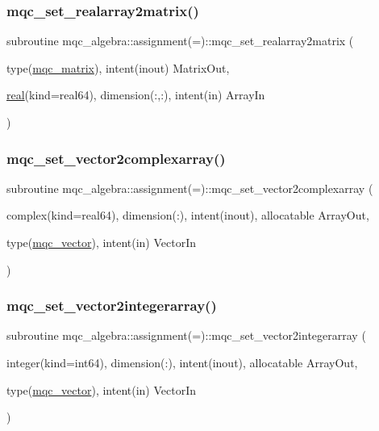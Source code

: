 \subsubsection{\texorpdfstring{mqc\_set\_realarray2matrix()}{mqc\_set\_realarray2matrix()}}
{\footnotesize\ttfamily subroutine mqc\+\_\+algebra\+::assignment(=)\+::mqc\+\_\+set\+\_\+realarray2matrix (\begin{DoxyParamCaption}\item[{type(\mbox{\hyperlink{structmqc__algebra_1_1mqc__matrix}{mqc\+\_\+matrix}}), intent(inout)}]{Matrix\+Out,  }\item[{\mbox{\hyperlink{interfacemqc__algebra_1_1real}{real}}(kind=real64), dimension(\+:,\+:), intent(in)}]{Array\+In }\end{DoxyParamCaption})}

\mbox{\label{interfacemqc__algebra_1_1assignment_07_0A_08_ae58b010eaac26b048c8ffb0f04aa7cfb}} 
\subsubsection{\texorpdfstring{mqc\_set\_vector2complexarray()}{mqc\_set\_vector2complexarray()}}
{\footnotesize\ttfamily subroutine mqc\+\_\+algebra\+::assignment(=)\+::mqc\+\_\+set\+\_\+vector2complexarray (\begin{DoxyParamCaption}\item[{complex(kind=real64), dimension(\+:), intent(inout), allocatable}]{Array\+Out,  }\item[{type(\mbox{\hyperlink{structmqc__algebra_1_1mqc__vector}{mqc\+\_\+vector}}), intent(in)}]{Vector\+In }\end{DoxyParamCaption})}

\mbox{\label{interfacemqc__algebra_1_1assignment_07_0A_08_af60e7fa480d0caad0efda1ad9eabd866}} 
\subsubsection{\texorpdfstring{mqc\_set\_vector2integerarray()}{mqc\_set\_vector2integerarray()}}
{\footnotesize\ttfamily subroutine mqc\+\_\+algebra\+::assignment(=)\+::mqc\+\_\+set\+\_\+vector2integerarray (\begin{DoxyParamCaption}\item[{integer(kind=int64), dimension(\+:), intent(inout), allocatable}]{Array\+Out,  }\item[{type(\mbox{\hyperlink{structmqc__algebra_1_1mqc__vector}{mqc\+\_\+vector}}), intent(in)}]{Vector\+In }\end{DoxyParamCaption})}


